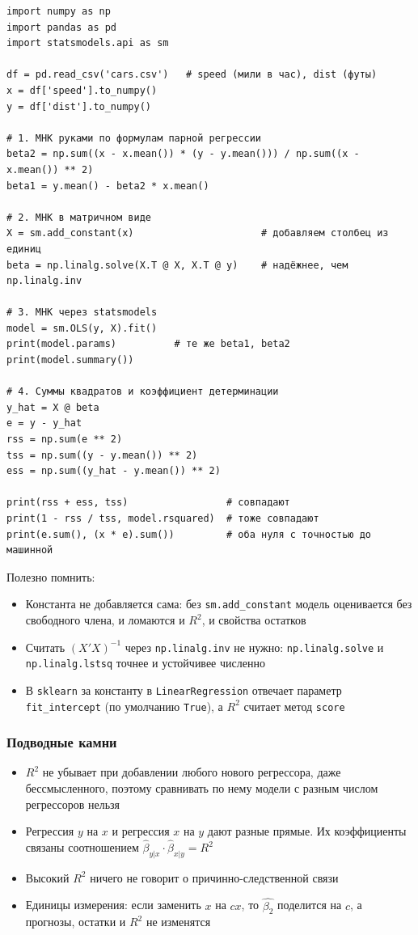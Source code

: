 \documentclass[12pt,a4paper]{article}
\numberwithin{equation}{section}
\theoremstyle{plain}
\theoremstyle{definition}
\theoremstyle{remark}
\begin{document}
\begin{verbatim}
import numpy as np
import pandas as pd
import statsmodels.api as sm

df = pd.read_csv('cars.csv')   # speed (мили в час), dist (футы)
x = df['speed'].to_numpy()
y = df['dist'].to_numpy()

# 1. МНК руками по формулам парной регрессии
beta2 = np.sum((x - x.mean()) * (y - y.mean())) / np.sum((x - x.mean()) ** 2)
beta1 = y.mean() - beta2 * x.mean()

# 2. МНК в матричном виде
X = sm.add_constant(x)                      # добавляем столбец из единиц
beta = np.linalg.solve(X.T @ X, X.T @ y)    # надёжнее, чем np.linalg.inv

# 3. МНК через statsmodels
model = sm.OLS(y, X).fit()
print(model.params)          # те же beta1, beta2
print(model.summary())

# 4. Суммы квадратов и коэффициент детерминации
y_hat = X @ beta
e = y - y_hat
rss = np.sum(e ** 2)
tss = np.sum((y - y.mean()) ** 2)
ess = np.sum((y_hat - y.mean()) ** 2)

print(rss + ess, tss)                 # совпадают
print(1 - rss / tss, model.rsquared)  # тоже совпадают
print(e.sum(), (x * e).sum())         # оба нуля с точностью до машинной
\end{verbatim}

Полезно помнить:

\begin{itemize}
    \item Константа не добавляется сама: без \texttt{sm.add\_constant} модель оценивается без свободного члена, и ломаются и $R^2$, и свойства остатков
    \item Считать $\left(X'X\right)^{-1}$ через \texttt{np.linalg.inv} не нужно: \texttt{np.linalg.solve} и \texttt{np.linalg.lstsq} точнее и устойчивее численно
    \item В \texttt{sklearn} за константу в \texttt{LinearRegression} отвечает параметр \texttt{fit\_intercept} (по умолчанию \texttt{True}), а $R^2$ считает метод \texttt{score}
\end{itemize}

\subsubsection{Подводные камни}

\begin{itemize}
    \item $R^2$ не убывает при добавлении любого нового регрессора, даже бессмысленного, поэтому сравнивать по нему модели с разным числом регрессоров нельзя
    \item Регрессия $y$ на $x$ и регрессия $x$ на $y$ дают разные прямые. Их коэффициенты связаны соотношением $\hat{\beta}_{y|x} \cdot \hat{\beta}_{x|y} = R^2$
    \item Высокий $R^2$ ничего не говорит о причинно-следственной связи
    \item Единицы измерения: если заменить $x$ на $cx$, то $\hat{\beta_2}$ поделится на $c$, а прогнозы, остатки и $R^2$ не изменятся
\end{itemize}
\end{document}
